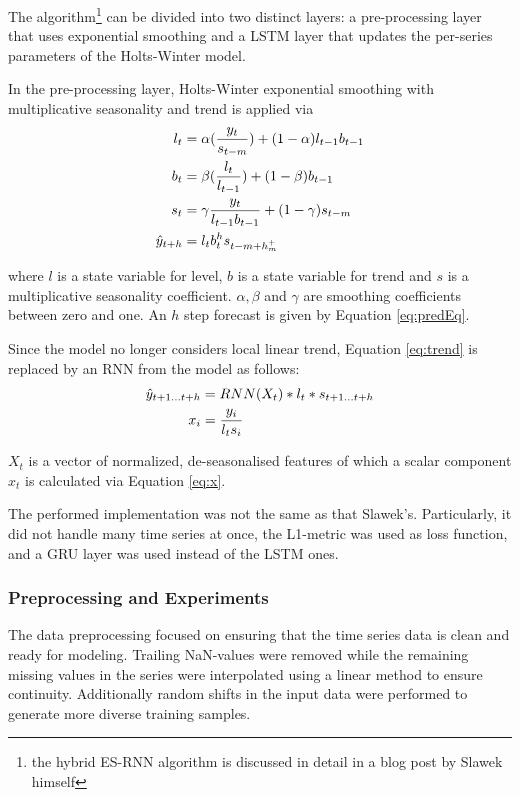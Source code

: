 \documentclass[conference]{IEEEtran}
\begin{document}
The algorithm\footnote{the hybrid ES-RNN algorithm is discussed in detail in a blog post by Slawek himself\cite{slawek}} can be divided into two distinct layers: a pre-processing layer that uses exponential smoothing and a LSTM layer that updates the per-series parameters of the Holts-Winter model.

In the pre-processing layer, Holts-Winter exponential smoothing\cite{winters} with multiplicative seasonality and trend is applied via
\begin{align}
    l_t &= \alpha(\frac{y_t}{s_{t-m}}) + (1 - \alpha)l_{t-1} b_{t-1} \label{eq:level}\\
    b_t &= \beta(\frac{l_t}{l_{t-1}}) + (1- \beta) b_{t-1} \label{eq:trend} \\ 
    s_{t} &= \gamma \frac{y_t}{l_{t-1} b_{t-1}} + (1-\gamma)s_{t-m} \label{eq:season}\\
    \Hat{y}_{t+h} &= l_t  b_t^h s_{t-m+h^+_m} \label{eq:predEq}
\end{align}

where $l$ is a state variable for level, $b$ is a state variable for trend and $s$ is a multiplicative seasonality coefficient. $\alpha, \beta$ and $\gamma$ are smoothing coefficients between zero and one. An $h$ step forecast is given by Equation \ref{eq:predEq}.

Since the model no longer considers local linear trend, Equation \ref{eq:trend} is replaced by an RNN from the model as follows:
\begin{align}
    \Hat{y}_{t+1 \dots t+h} &= RNN(X_t) * l_t * s_{t+1 \dots t+h} \label{eq:modifiedEq}\\
    x_i &= \frac{y_i}{l_t s_i} \label{eq:x}
\end{align}

$X_t$ is a vector of normalized, de-seasonalised features of which a scalar component $x_t$ is calculated via Equation \ref{eq:x}.

The performed implementation was not the same as that Slawek's\cite{esrnn}. Particularly, it did not handle many time series at once, the L1-metric was used as loss function, and a GRU layer was used instead of the LSTM ones.

\subsubsection{Preprocessing and Experiments}

The data preprocessing focused on ensuring that the time series data is clean and ready for modeling. Trailing NaN-values were removed while the remaining missing values in the series were interpolated using a linear method to ensure continuity. Additionally random shifts in the input data were performed to generate more diverse training samples.
\end{document}
